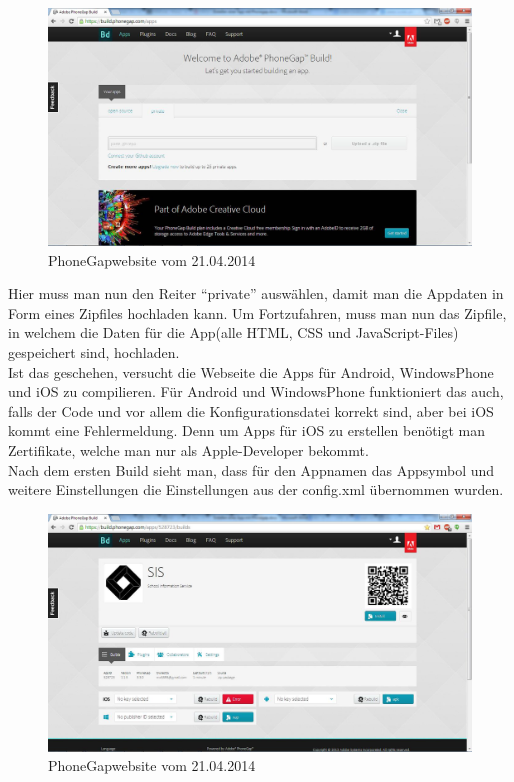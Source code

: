 \begin{figure}[H]
\includegraphics[keepaspectratio=true, width=14cm]{images/phoneGap/PhoneGap1.png}
\caption{PhoneGapwebsite vom 21.04.2014}
\end{figure}

Hier muss man nun den Reiter \enquote{private} auswählen, damit man die Appdaten in Form eines Zipfiles hochladen kann.
Um Fortzufahren, muss man nun das Zipfile, in welchem die Daten für die App(alle HTML, CSS und JavaScript-Files) gespeichert sind, hochladen.\\
Ist das geschehen, versucht die Webseite die Apps für Android, WindowsPhone und iOS zu compilieren. Für Android und WindowsPhone funktioniert das auch, falls der Code und vor allem die Konfigurationsdatei korrekt sind, aber bei iOS kommt eine Fehlermeldung. Denn um Apps für iOS zu erstellen benötigt man Zertifikate, welche man nur als Apple-Developer bekommt.\\
Nach dem ersten Build sieht man, dass für den Appnamen das Appsymbol und weitere Einstellungen die Einstellungen aus der config.xml übernommen wurden.\\

\begin{figure}[H]
\includegraphics[keepaspectratio=true, width=14cm]{images/phoneGap/PhoneGap2.png}
\caption{PhoneGapwebsite vom 21.04.2014}
\end{figure}

